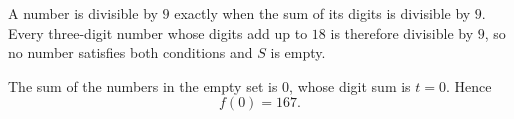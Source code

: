 A number is divisible by $9$ exactly when the sum of its digits is divisible by $9$. Every three-digit number whose digits add up to $18$ is therefore divisible by $9$, so no number satisfies both conditions and $S$ is empty.

The sum of the numbers in the empty set is $0$, whose digit sum is $t=0$. Hence
\[f(0)=\boxed{167}.\]
